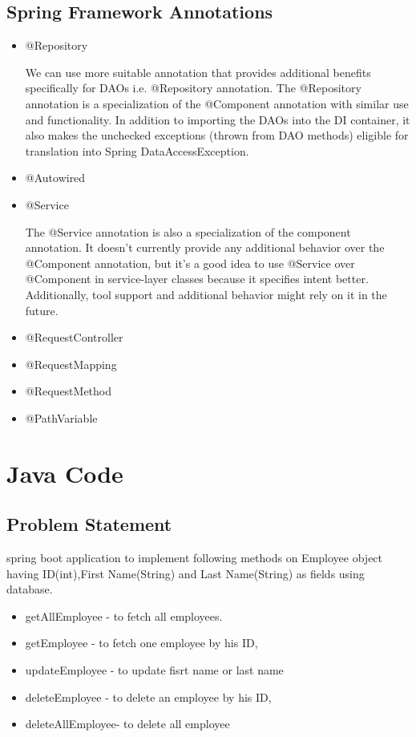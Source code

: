 \documentclass{report}
\begin{document}
	\subsection{Spring Framework Annotations}
	\begin{itemize}
		\item @Repository
		\par We can use more suitable annotation that provides additional benefits specifically for DAOs i.e. @Repository annotation. The @Repository annotation is a specialization of the @Component annotation with similar use and functionality. In addition to importing the DAOs into the DI container, it also makes the unchecked exceptions (thrown from DAO methods) eligible for translation into Spring DataAccessException.
		
		\item @Autowired
		\item @Service
		\par The @Service annotation is also a specialization of the component annotation. It doesn’t currently provide any additional behavior over the @Component annotation, but it’s a good idea to use @Service over @Component in service-layer classes because it specifies intent better. Additionally, tool support and additional behavior might rely on it in the future.
		\item @RequestController
		
		\item @RequestMapping
		\item @RequestMethod
		\item @PathVariable
		  
	\end{itemize}
	\section{Java Code}
	\subsection{Problem Statement}
		spring boot application to implement following methods on Employee object having ID(int),First Name(String) and Last Name(String) as fields using database.
		\begin{itemize}
			\item getAllEmployee -   to fetch all employees.
			\item getEmployee    -   to fetch one employee by his ID,
			\item updateEmployee -   to update fisrt name or last name 
			\item deleteEmployee -   to delete an employee by his ID,
			\item deleteAllEmployee- to delete all employee  
		\end{itemize}  
\end{document}
